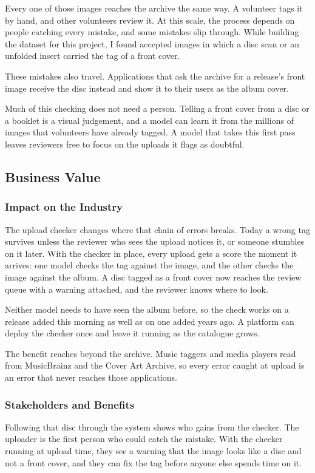 \documentclass[conference]{IEEEtran}
\begin{document}
Every one of those images reaches the archive the same way. A volunteer tags it by hand, and other volunteers review it. At this scale, the process depends on people catching every mistake, and some mistakes slip through. While building the dataset for this project, I found accepted images in which a disc scan or an unfolded insert carried the tag of a front cover.

These mistakes also travel. Applications that ask the archive for a release's front image receive the disc instead and show it to their users as the album cover.

Much of this checking does not need a person. Telling a front cover from a disc or a booklet is a visual judgement, and a model can learn it from the millions of images that volunteers have already tagged. A model that takes this first pass leaves reviewers free to focus on the uploads it flags as doubtful.

\subsection{Business Value}\label{sec:value}

\subsubsection{Impact on the Industry}\label{sec:impact}
The upload checker changes where that chain of errors breaks. Today a wrong tag survives unless the reviewer who sees the upload notices it, or someone stumbles on it later. With the checker in place, every upload gets a score the moment it arrives: one model checks the tag against the image, and the other checks the image against the album. A disc tagged as a front cover now reaches the review queue with a warning attached, and the reviewer knows where to look.

Neither model needs to have seen the album before, so the check works on a release added this morning as well as on one added years ago. A platform can deploy the checker once and leave it running as the catalogue grows.

The benefit reaches beyond the archive. Music taggers and media players read from MusicBrainz and the Cover Art Archive, so every error caught at upload is an error that never reaches those applications.

\subsubsection{Stakeholders and Benefits}\label{sec:stakeholders}
Following that disc through the system shows who gains from the checker. The uploader is the first person who could catch the mistake. With the checker running at upload time, they see a warning that the image looks like a disc and not a front cover, and they can fix the tag before anyone else spends time on it.
\end{document}
